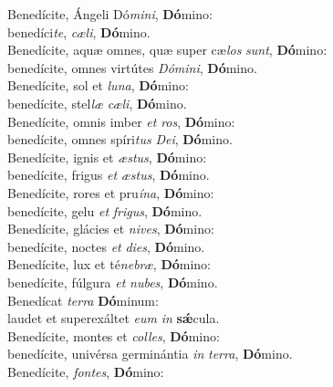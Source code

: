 \evenverse Benedícite, Ángeli Dó\textit{mi}\textit{ni}, \textbf{Dó}mino:~\*\\
\evenverse benedíci\textit{te}, \textit{cæ}\textit{li}, \textbf{Dó}mino.\\
\oddverse Benedícite, aquæ omnes, quæ super cæ\textit{los} \textit{sunt}, \textbf{Dó}mino:~\*\\
\oddverse benedícite, omnes virtútes \textit{Dó}\textit{mi}\textit{ni}, \textbf{Dó}mino.\\
\evenverse Benedícite, sol et \textit{lu}\textit{na}, \textbf{Dó}mino:~\*\\
\evenverse benedícite, stel\textit{læ} \textit{cæ}\textit{li}, \textbf{Dó}mino.\\
\oddverse Benedícite, omnis imber \textit{et} \textit{ros}, \textbf{Dó}mino:~\*\\
\oddverse benedícite, omnes spíri\textit{tus} \textit{De}\textit{i}, \textbf{Dó}mino.\\
\evenverse Benedícite, ignis et \textit{æ}\textit{stus}, \textbf{Dó}mino:~\*\\
\evenverse benedícite, frigus \textit{et} \textit{æ}\textit{stus}, \textbf{Dó}mino.\\
\oddverse Benedícite, rores et pru\textit{í}\textit{na}, \textbf{Dó}mino:~\*\\
\oddverse benedícite, gelu \textit{et} \textit{fri}\textit{gus}, \textbf{Dó}mino.\\
\evenverse Benedícite, glácies et \textit{ni}\textit{ves}, \textbf{Dó}mino:~\*\\
\evenverse benedícite, noctes \textit{et} \textit{di}\textit{es}, \textbf{Dó}mino.\\
\oddverse Benedícite, lux et té\textit{ne}\textit{bræ}, \textbf{Dó}mino:~\*\\
\oddverse benedícite, fúlgura \textit{et} \textit{nu}\textit{bes}, \textbf{Dó}mino.\\
\evenverse Benedícat \textit{ter}\textit{ra} \textbf{Dó}minum:~\*\\
\evenverse laudet et superexáltet \textit{e}\textit{um} \textit{in} \textbf{sǽ}cula.\\
\oddverse Benedícite, montes et \textit{col}\textit{les}, \textbf{Dó}mino:~\*\\
\oddverse benedícite, univérsa germinántia \textit{in} \textit{ter}\textit{ra}, \textbf{Dó}mino.\\
\evenverse Benedícite, \textit{fon}\textit{tes}, \textbf{Dó}mino:~\*\\
